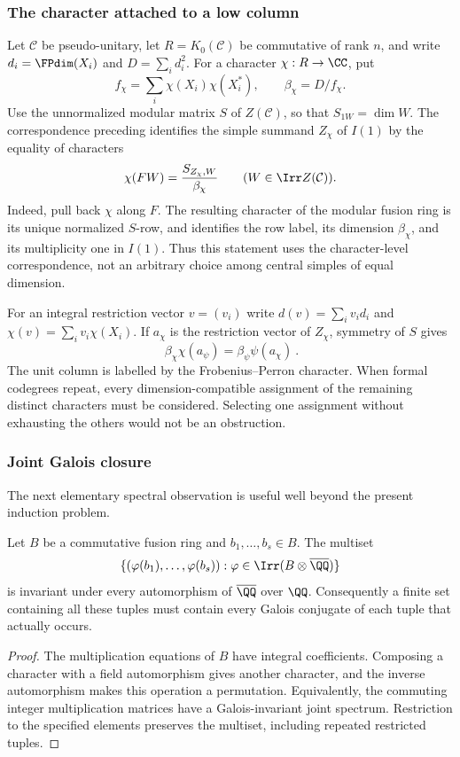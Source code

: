 \subsubsection{The character attached to a low column}
Let $\mathcal C$ be pseudo-unitary, let $R=K_0(\mathcal C)$ be
commutative of rank $n$, and write $d_i=\FPdim(X_i)$ and
$D=\sum_i d_i^2$. For a character $\chi:R\to\CC$, put
\[
 f_\chi=\sum_i\chi(X_i)\chi(X_i^*),\qquad
 \beta_\chi=D/f_\chi.
\]
Use the unnormalized modular matrix $S$ of $Z(\mathcal C)$, so that
$S_{1W}=\dim W$. The correspondence preceding
\cite[Theorem~2.13]{Ostrik3} identifies the simple summand $Z_\chi$ of
$I(1)$ by the equality of characters
\begin{equation}\label{eq:central-character}
 \chi(FW)=\frac{S_{Z_\chi,W}}{\beta_\chi}
 \qquad(W\in\Irr Z(\mathcal C)).
\end{equation}
Indeed, pull back $\chi$ along $F$. The resulting character of the
modular fusion ring is its unique normalized $S$-row, and
\cite[Theorem~2.13]{Ostrik3} identifies the row label, its dimension
$\beta_\chi$, and its multiplicity one in $I(1)$. Thus this statement
uses the character-level correspondence, not an arbitrary choice among
central simples of equal dimension.

For an integral restriction vector $v=(v_i)$ write
$d(v)=\sum_i v_i d_i$ and $\chi(v)=\sum_i v_i\chi(X_i)$.
If $a_\chi$ is the restriction vector of $Z_\chi$, symmetry of $S$
gives
\begin{equation}\label{eq:character-reciprocity}
 \boxed{\ \beta_\chi\chi(a_\psi)
             =\beta_\psi\psi(a_\chi)\ }.
\end{equation}
The unit column is labelled by the Frobenius--Perron character. When
formal codegrees repeat, every dimension-compatible assignment of the
remaining distinct characters must be considered. Selecting one
assignment without exhausting the others would not be an obstruction.

\subsubsection{Joint Galois closure}
The next elementary spectral observation is useful well beyond the
present induction problem.
\begin{lemma}\label{lem:joint-spectrum}
Let $B$ be a commutative fusion ring and $b_1,\ldots,b_s\in B$.
The multiset
\[
 \{(\varphi(b_1),\ldots,\varphi(b_s)):
                    \varphi\in\Irr(B\otimes\overline\QQ)\}
\]
is invariant under every automorphism of $\overline\QQ$ over $\QQ$.
Consequently a finite set containing all these tuples must contain
every Galois conjugate of each tuple that actually occurs.
\end{lemma}
\begin{proof}
The multiplication equations of $B$ have integral coefficients. Composing
a character with a field automorphism gives another character, and the
inverse automorphism makes this operation a permutation. Equivalently,
the commuting integer multiplication matrices have a Galois-invariant
joint spectrum. Restriction to the specified elements preserves the
multiset, including repeated restricted tuples.
\end{proof}

